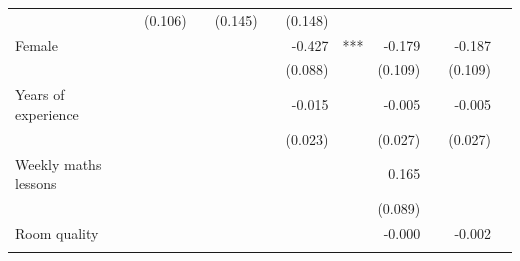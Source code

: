 \documentclass{article}
\begin{document}
\begin{table}[!h]
\begin{tabular}{lllllllllll}
  \multicolumn{1}{l}{} &
  \multicolumn{1}{r}{(0.106)} &
  \multicolumn{1}{l}{} &
  \multicolumn{1}{r}{(0.145)} &
  \multicolumn{1}{l}{} &
  \multicolumn{1}{r}{(0.148)} &
  \multicolumn{1}{l}{} \\
\multicolumn{1}{l}{Female} &
  \multicolumn{1}{r}{} &
  \multicolumn{1}{l}{} &
  \multicolumn{1}{r}{} &
  \multicolumn{1}{l}{} &
  \multicolumn{1}{r}{-0.427} &
  \multicolumn{1}{l}{***} &
  \multicolumn{1}{r}{-0.179} &
  \multicolumn{1}{l}{} &
  \multicolumn{1}{r}{-0.187} &
  \multicolumn{1}{l}{} \\
\multicolumn{1}{l}{} &
  \multicolumn{1}{r}{} &
  \multicolumn{1}{l}{} &
  \multicolumn{1}{r}{} &
  \multicolumn{1}{l}{} &
  \multicolumn{1}{r}{(0.088)} &
  \multicolumn{1}{l}{} &
  \multicolumn{1}{r}{(0.109)} &
  \multicolumn{1}{l}{} &
  \multicolumn{1}{r}{(0.109)} &
  \multicolumn{1}{l}{} \\
\multicolumn{1}{l}{Years of experience} &
  \multicolumn{1}{r}{} &
  \multicolumn{1}{l}{} &
  \multicolumn{1}{r}{} &
  \multicolumn{1}{l}{} &
  \multicolumn{1}{r}{-0.015} &
  \multicolumn{1}{l}{} &
  \multicolumn{1}{r}{-0.005} &
  \multicolumn{1}{l}{} &
  \multicolumn{1}{r}{-0.005} &
  \multicolumn{1}{l}{} \\
\multicolumn{1}{l}{} &
  \multicolumn{1}{r}{} &
  \multicolumn{1}{l}{} &
  \multicolumn{1}{r}{} &
  \multicolumn{1}{l}{} &
  \multicolumn{1}{r}{(0.023)} &
  \multicolumn{1}{l}{} &
  \multicolumn{1}{r}{(0.027)} &
  \multicolumn{1}{l}{} &
  \multicolumn{1}{r}{(0.027)} &
  \multicolumn{1}{l}{} \\
\multicolumn{1}{l}{Weekly maths lessons} &
  \multicolumn{1}{r}{} &
  \multicolumn{1}{l}{} &
  \multicolumn{1}{r}{} &
  \multicolumn{1}{l}{} &
  \multicolumn{1}{r}{} &
  \multicolumn{1}{l}{} &
  \multicolumn{1}{r}{0.165} &
  \multicolumn{1}{l}{} &
  \multicolumn{1}{r}{} &
  \multicolumn{1}{l}{} \\
\multicolumn{1}{l}{} &
  \multicolumn{1}{r}{} &
  \multicolumn{1}{l}{} &
  \multicolumn{1}{r}{} &
  \multicolumn{1}{l}{} &
  \multicolumn{1}{r}{} &
  \multicolumn{1}{l}{} &
  \multicolumn{1}{r}{(0.089)} &
  \multicolumn{1}{l}{} &
  \multicolumn{1}{r}{} &
  \multicolumn{1}{l}{} \\
\multicolumn{1}{l}{Room quality} &
  \multicolumn{1}{r}{} &
  \multicolumn{1}{l}{} &
  \multicolumn{1}{r}{} &
  \multicolumn{1}{l}{} &
  \multicolumn{1}{r}{} &
  \multicolumn{1}{l}{} &
  \multicolumn{1}{r}{-0.000} &
  \multicolumn{1}{l}{} &
  \multicolumn{1}{r}{-0.002} &
  \multicolumn{1}{l}{} \\
\multicolumn{1}{l}{} &

\end{tabular}
\end{table}
\end{document}
